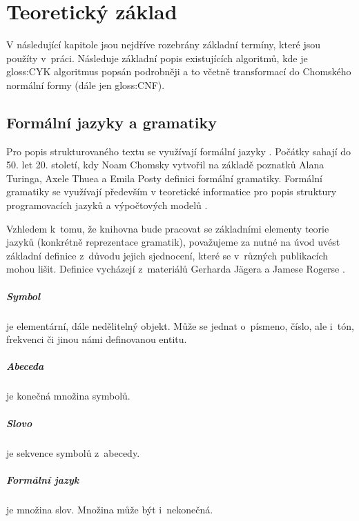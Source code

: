 \chapter{Teoretický základ}
	V následující kapitole jsou nejdříve rozebrány základní termíny, které jsou použíty v~práci. Následuje základní popis existujících algoritmů, kde je \gls{gloss:CYK} algoritmus popsán podrobněji a to včetně transformací do Chomského normální formy (dále jen \gls{gloss:CNF}).
	
	\section{Formální jazyky a gramatiky}
		\label{sec:formalLanguagesAndGrammars}
		Pro popis strukturovaného textu se využívají formální jazyky \cite{Meduna:2014:FLC:2636678}. Počátky sahají do 50. let 20. století, kdy Noam Chomsky vytvořil na základě poznatků Alana Turinga, Axele Thuea a Emila Posty definici formální gramatiky. Formální gramatiky se využívají především v teoretické informatice pro popis struktury programovacích jazyků a výpočtových modelů \cite{Havill:2015:DCS:2855048}.
		
		Vzhledem k~tomu, že knihovna bude pracovat se základními elementy teorie jazyků (konkrétně reprezentace gramatik), považujeme za nutné na úvod uvést základní definice z~důvodu jejich sjednocení, které se v~různých publikacích mohou lišit. Definice vycházejí z~materiálů Gerharda Jägera a Jamese Rogerse \cite{Jager2012}.
	
		\paragraph{Symbol}
		je elementární, dále nedělitelný objekt. Může se jednat o~písmeno, číslo, ale i~tón, frekvenci či jinou námi definovanou entitu.
		\paragraph{Abeceda}
		je konečná množina symbolů.
		\paragraph{Slovo}
		je sekvence symbolů z~abecedy.
		\paragraph{Formální jazyk}
		je množina slov. Množina může být i~nekonečná.
		
		\vspace{1em}
		
